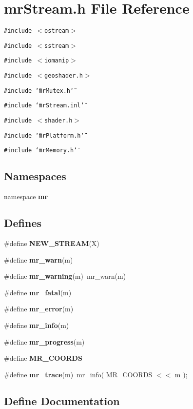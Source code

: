 \section{mr\-Stream.h File Reference}
\label{mrStream_8h}
{\tt \#include $<$ostream$>$}\par
{\tt \#include $<$sstream$>$}\par
{\tt \#include $<$iomanip$>$}\par
{\tt \#include $<$geoshader.h$>$}\par
{\tt \#include \char`\"{}mr\-Mutex.h\char`\"{}}\par
{\tt \#include \char`\"{}mr\-Stream.inl\char`\"{}}\par
{\tt \#include $<$shader.h$>$}\par
{\tt \#include \char`\"{}mr\-Platform.h\char`\"{}}\par
{\tt \#include \char`\"{}mr\-Memory.h\char`\"{}}\par
\subsection*{Namespaces}
\begin{CompactItemize}
\item 
namespace {\bf mr}
\end{CompactItemize}
\subsection*{Defines}
\begin{CompactItemize}
\item 
\#define {\bf NEW\_\-STREAM}(X)
\item 
\#define {\bf mr\_\-warn}(m)
\item 
\#define {\bf mr\_\-warning}(m)\ mr\_\-warn(m)
\item 
\#define {\bf mr\_\-fatal}(m)
\item 
\#define {\bf mr\_\-error}(m)
\item 
\#define {\bf mr\_\-info}(m)
\item 
\#define {\bf mr\_\-progress}(m)
\item 
\#define {\bf MR\_\-COORDS}
\item 
\#define {\bf mr\_\-trace}(m)\ mr\_\-info( MR\_\-COORDS $<$$<$ m );
\end{CompactItemize}


\subsection{Define Documentation}
